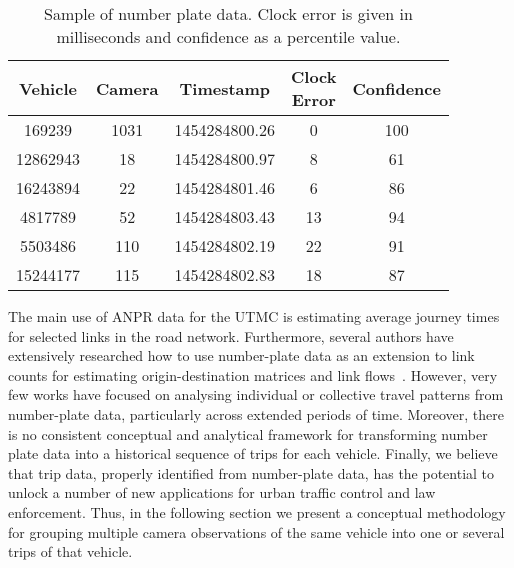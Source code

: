 \begin{table}[ht]
\centering
\tabcolsep=0.17cm
\small
\begin{tabular}{c c c c c}
  \hline
  Vehicle & Camera & Timestamp & \thead{Clock \\Error} & Confidence \\
  \hline
  169239 & 1031 & 1454284800.26 &   0 & 100 \\
  12862943 & 18 & 1454284800.97 &   8 &  61 \\
  16243894 & 22 & 1454284801.46 &   6 &  86 \\
  4817789 & 52 & 1454284803.43 &  13 &  94 \\
  5503486 & 110 & 1454284802.19 &  22 &  91 \\
  15244177 & 115 & 1454284802.83 &  18 &  87 \\
   \hline
\end{tabular}
\caption{Sample of number plate data. Clock error is given in milliseconds and confidence as a percentile value.}
\label{t:np_data_example}
\end{table}

{
The main use of ANPR data for the UTMC is estimating average journey times for selected links in the road network. Furthermore, several authors have extensively researched how to use number-plate data as an extension to link counts for estimating origin-destination matrices and link flows~\cite{Castillo2010, Castillo2008, Hazelton2012}. However, very few works have focused on analysing individual or collective travel patterns from number-plate data, particularly across extended periods of time. Moreover, there is no consistent conceptual and analytical framework for transforming number plate data into a historical sequence of trips for each vehicle. Finally, we believe that trip data, properly identified from number-plate data, has the potential to unlock a number of new applications for urban traffic control and law enforcement. Thus, in the following section we present a conceptual methodology for grouping multiple camera observations of the same vehicle into one or several trips of that vehicle.
}